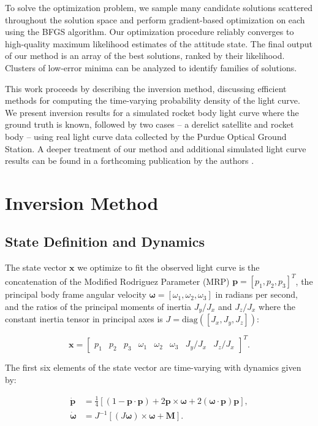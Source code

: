 \documentclass[a4paper,twocolumn]{spaceDebrisC} %
\newcommand{\vctr}[1]{\bm{#1}}
\begin{document}
To solve the optimization problem, we sample many candidate solutions scattered throughout the solution space and perform gradient-based optimization on each using the BFGS algorithm. Our optimization procedure reliably converges to high-quality maximum likelihood estimates of the attitude state. The final output of our method is an array of the best solutions, ranked by their likelihood. Clusters of low-error minima can be analyzed to identify families of solutions.

This work proceeds by describing the inversion method, discussing efficient methods for computing the time-varying probability density of the light curve. We present inversion results for a simulated rocket body light curve where the ground truth is known, followed by two cases -- a derelict satellite and rocket body -- using real light curve data collected by the Purdue Optical Ground Station. A deeper treatment of our method and additional simulated light curve results can be found in a forthcoming publication by the authors \cite{robinson2025att}.

\section{Inversion Method}

\subsection{State Definition and Dynamics}

The state vector $\vctr{x}$ we optimize to fit the observed light curve is the concatenation of the Modified Rodriguez Parameter (MRP) $\vctr{p} = [p_1, p_2, p_3]^T$, the principal body frame angular velocity $\vctr{\omega} = [\omega_1, \omega_2, \omega_3]$ in radians per second, and the ratios of the principal moments of inertia $J_y / J_x$ and $J_z / J_x$ where the constant inertia tensor in principal axes is $J = \mathrm{diag}\left([J_x, J_y, J_z]\right)$:

\begin{equation}
 \vctr{x} = \begin{bmatrix} 
 p_1 & p_2 & p_3 & \omega_1 & \omega_2 & \omega_3 & J_y / J_x & J_z / J_x
  \end{bmatrix}^T.
\end{equation}

The first six elements of the state vector are time-varying with dynamics given by:

\begin{align}
 \vctr{\dot{p}} &= \frac{1}{4} \left[ \left(1 - \vctr{p} \cdot \vctr{p}\right) + 2\vctr{p} \times \vctr{\omega} + 2 \left(\vctr{\omega} \cdot \vctr{p} \right)\vctr{p} \right], \label{eq:mrp_kde} \\
 \vctr{\dot{\omega}} &= J^{-1} \left[ \left(J \vctr{\omega}\right) \times \vctr{\omega} + \vctr{M}\right]. \label{eq:rbtf_dynamics}
\end{align}
\end{document}
